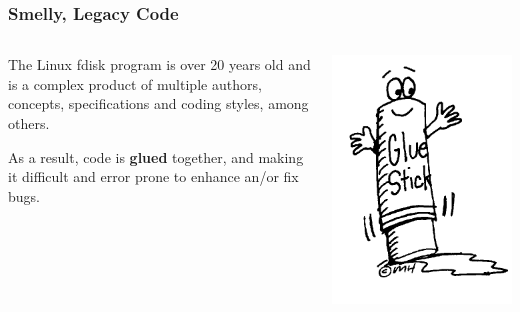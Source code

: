 \documentclass{beamer}
\begin{document}
\begin{frame}\frametitle{Smelly, Legacy Code}
  \begin{columns}
    \begin{column}{.5\linewidth}
      The Linux fdisk program is over 20 years old and is a complex product of multiple authors, concepts, specifications and coding styles, among others.\newline

      As a result, code is \textbf{glued} together, and making it difficult and error prone to enhance an/or fix bugs.
    \end{column}
    \begin{column}{.5\linewidth}
      \includegraphics[scale=0.2]{img/glustick}
    \end{column}
  \end{columns}
\end{frame}
\end{document}
